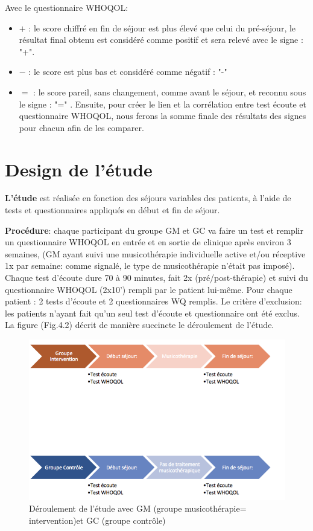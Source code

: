 Avec le questionnaire WHOQOL:	
\begin{itemize}
\item$+$  :  le score chiffré  en fin de séjour est plus élevé
que celui du
pré-séjour, le résultat final obtenu est considéré comme
positif et sera relevé  avec le signe : "+". 
\item $-$ : le score est plus bas et considéré comme négatif : "-"  
\item$=$ : le score pareil, sans changement,  comme avant le séjour, et reconnu sous le signe :  "=" .
Ensuite, pour créer le lien et la corrélation entre test écoute et questionnaire WHOQOL, nous ferons la 
somme finale des résultats des signes pour chacun afin de les comparer.
\end{itemize}


\section{Design de l'étude}

	


\textbf{L'étude} est
réalisée en fonction des séjours variables des patients, à l'aide de tests et questionnaires appliqués en 
début
et fin de séjour.

\textbf{Procédure}: chaque participant du groupe GM et GC va faire  un
test et remplir un questionnaire  WHOQOL en entrée et en sortie de
clinique  après environ 3 semaines, (GM ayant suivi une musicothérapie individuelle active et/ou réceptive 
1x par
semaine:  comme signalé, le type de musicothérapie n'était pas imposé).
Chaque test d'écoute dure
70 à 90 minutes, fait 2x (pré/post-thérapie) et
suivi du questionnaire WHOQOL (2x10') rempli par le
patient lui-même.
Pour chaque patient : 2 tests d'écoute et 2 
questionnaires WQ 
remplis. Le critère d'exclusion: les patients n'ayant fait qu'un seul test d'écoute et questionnaire  ont été 
exclus.
La  figure (Fig.4.2) décrit de manière succincte le déroulement de
l'étude. 
\begin{figure}[hb]
	\centering
	\includegraphics[width=0.7\linewidth]{images/Groupecontrole.png}
	\caption[Schéma du déroulement]{Déroulement de l'étude avec GM (groupe musicothérapie=
		intervention)et GC 
		(groupe contrôle)}
	\end{figure}





